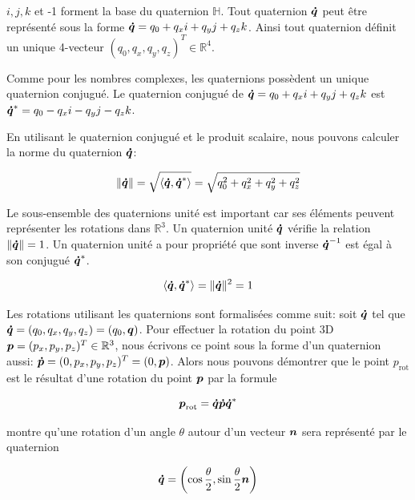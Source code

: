 \documentclass[12pt,a4paper]{report}
\begin{document}
\begin{appendix}
		\para $i,j,k$ et -1 forment la base du quaternion $\mathbb{H}$. Tout quaternion $\boldsymbol{\dot{q}}$ peut être représenté sous la forme $\boldsymbol{\dot{q}} = q_0 + q_xi + q_yj+q_zk$. Ainsi tout quaternion définit un unique 4-vecteur $(q_0, q_x, q_y, q_z)^T \in \mathbb{R}^4$. 
		
		\para Comme pour les nombres complexes, les quaternions possèdent un unique quaternion conjugué. Le quaternion conjugué de $\boldsymbol{\dot{q}} = q_0 + q_xi + q_yj+q_zk$ est $\boldsymbol{\dot{q}}^\ast = q_0 - q_xi - q_yj-q_zk$.
		
		\para En utilisant le quaternion conjugué et le produit scalaire, nous pouvons calculer la norme du quaternion $\boldsymbol{\dot{q}}$:
		
		\begin{equation*}
		\|\boldsymbol{\dot{q}}\| = \sqrt{\langle \boldsymbol{\dot{q}}, \boldsymbol{\dot{q}}^{\ast} \rangle} = \sqrt{q_0^2 + q_x^2 + q_y^2 + q_z^2}
		\end{equation*} 
		
		\para Le sous-ensemble des quaternions unité est important car ses éléments peuvent représenter les rotations dans $\mathbb{R}^3$. Un quaternion unité $\boldsymbol{\dot{q}}$	vérifie la relation $\|\boldsymbol{\dot{q}}\| = 1$. Un quaternion unité a pour propriété que sont inverse $\boldsymbol{\dot{q}}^{-1}$ est égal à son conjugué $\boldsymbol{\dot{q}}^\ast$.
		
		\begin{equation*}
		\langle \boldsymbol{\dot{q}}, \boldsymbol{\dot{q}}^{\ast} \rangle = \|\boldsymbol{\dot{q}}\|^2 = 1
		\end{equation*}
		
		\para Les rotations utilisant les quaternions sont formalisées comme suit: soit $\boldsymbol{\dot{q}}$ tel que $\boldsymbol{\dot{q}} = (q_0,q_x,q_y,q_z) = (q_0,\boldsymbol{q})$. Pour effectuer la rotation du point 3D $\boldsymbol{p}=(p_x,p_y,p_z)^T \in \mathbb{R}^3$, nous écrivons ce point sous la forme d'un quaternion aussi: $\boldsymbol{\dot{p}} = (0, p_x,p_y,p_z)^T = (0,\boldsymbol{p})$. Alors nous pouvons démontrer que le point $p_{\mathrm{rot}}$ est le résultat d'une rotation du point $\boldsymbol{p}$ par la formule
		
		\begin{equation*}
		\boldsymbol{p}_{\mathrm{rot}} = \boldsymbol{\dot{q}\dot{p}\dot{q}}^{\ast}
		\end{equation*}
		
		\para \cite{nuchter_3d_2009} montre qu'une rotation d'un angle $\theta$ autour d'un vecteur $\boldsymbol{n}$ sera représenté par le quaternion 
		
		\begin{equation*}
			\boldsymbol{\dot{q}} = \left( \cos{\frac{\theta}{2}}, \sin{\frac{\theta}{2}}\boldsymbol{n} \right)
		\end{equation*}
		

\end{appendix}
\end{document}
